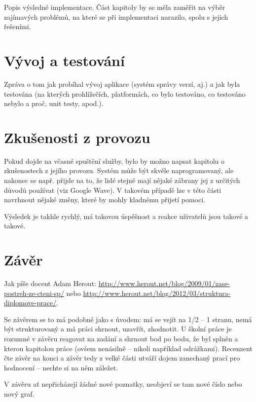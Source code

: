\documentclass[12pt,oneside,final]{fithesis2}
\begin{document}
Popis výsledné implementace. Část kapitoly by se měla zaměřit na výběr zajímavých problémů, na které se při implementaci narazilo, spolu s jejich řešeními.

\chapter{Vývoj a testování}
Zpráva o tom jak probíhal vývoj aplikace (systém správy verzí, aj.) a jak byla testována (na kterých prohlížečích, platformách, co bylo testováno, co testováno nebylo a proč, unit testy, apod.).

\chapter{Zkušenosti z provozu}
Pokud dojde na včasné spuštění služby, bylo by možno napsat kapitolu o zkušenostech z jejího provozu. Systém může být skvěle naprogramovaný, ale nakonec se např. přijde na to, že lidé stejně mají nějaké zábrany jej z určitých důvodů používat (viz Google Wave). V takovém případě lze v této části navrhnout nějaké změny, které by mohly kladnému přijetí pomoci.

Výsledek je takhle rychlý, má takovou úspěšnost a reakce uživatelů jsou takové a takové.

\chapter{Závěr}
Jak píše docent Adam Herout: \url{http://www.herout.net/blog/2009/01/zase-postreh-ze-cteni-sp/} nebo \url{http://www.herout.net/blog/2012/03/struktura-diplomove-prace/}.

Se závěrem se to má podobně jako s úvodem: má se vejít na 1/2 – 1 stranu, nemá být strukturovaný a má práci shrnout, uzavřít, zhodnotit. U školní práce je rozumné v závěru reagovat na zadání a shrnout bod po bodu, že byl splněn a kterou kapitolou práce (ovšem nenásilně – nikoli například odrážkami). Recenzent čte závěr na konci a závěr tedy z velké části utváří dojem zanechaný prací pro hodnocení – nechte si na něm záležet.

V závěru ať nepřicházejí žádné nové poznatky, neobjeví se tam nové číslo nebo nový graf.


% 
% 
\end{document}

